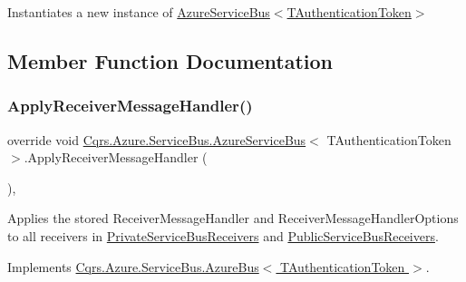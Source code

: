 Instantiates a new instance of \hyperlink{classCqrs_1_1Azure_1_1ServiceBus_1_1AzureServiceBus_a09e34bafdb96fb8136efa428df9f80b2_a09e34bafdb96fb8136efa428df9f80b2}{Azure\+Service\+Bus$<$\+T\+Authentication\+Token$>$} 



\subsection{Member Function Documentation}
\mbox{\label{classCqrs_1_1Azure_1_1ServiceBus_1_1AzureServiceBus_a6ea94560e02fce0d920c467062f5fc98_a6ea94560e02fce0d920c467062f5fc98}} 
\subsubsection{\texorpdfstring{Apply\+Receiver\+Message\+Handler()}{ApplyReceiverMessageHandler()}}
{\footnotesize\ttfamily override void \hyperlink{classCqrs_1_1Azure_1_1ServiceBus_1_1AzureServiceBus}{Cqrs.\+Azure.\+Service\+Bus.\+Azure\+Service\+Bus}$<$ T\+Authentication\+Token $>$.Apply\+Receiver\+Message\+Handler (\begin{DoxyParamCaption}{ }\end{DoxyParamCaption})\hspace{0.3cm}{\ttfamily [protected]}, {\ttfamily [virtual]}}



Applies the stored Receiver\+Message\+Handler and Receiver\+Message\+Handler\+Options to all receivers in \hyperlink{classCqrs_1_1Azure_1_1ServiceBus_1_1AzureServiceBus_ac52e1a7e17f4ffb80f95d31424101aaa_ac52e1a7e17f4ffb80f95d31424101aaa}{Private\+Service\+Bus\+Receivers} and \hyperlink{classCqrs_1_1Azure_1_1ServiceBus_1_1AzureServiceBus_ac73f294e6a99655f2ff7e391646f2e5d_ac73f294e6a99655f2ff7e391646f2e5d}{Public\+Service\+Bus\+Receivers}. 



Implements \hyperlink{classCqrs_1_1Azure_1_1ServiceBus_1_1AzureBus_aad25a164e9e526c59d8ef98635c98095_aad25a164e9e526c59d8ef98635c98095}{Cqrs.\+Azure.\+Service\+Bus.\+Azure\+Bus$<$ T\+Authentication\+Token $>$}.

